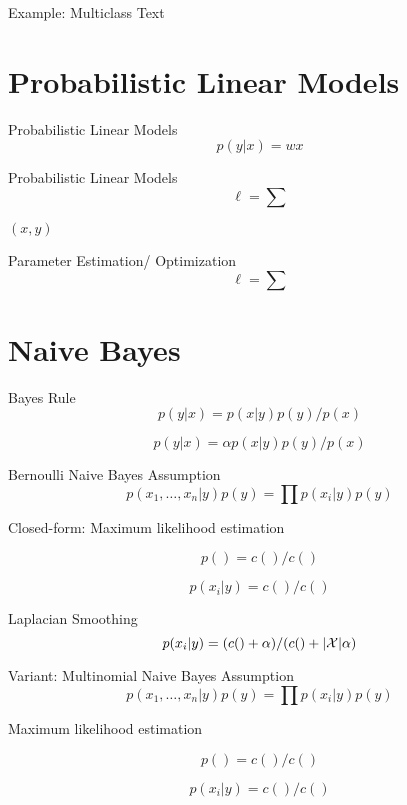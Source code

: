 \documentclass{beamer}
\begin{document}
\begin{frame}{Example: Multiclass Text}
  
\end{frame}

\section{Probabilistic Linear Models}


\begin{frame}{Probabilistic Linear Models} 
  \[ p(y | x) = w x \] 
\end{frame}


\begin{frame}{Probabilistic Linear Models} 
  \[ \ell = \sum \] 
\end{frame}

\begin{frame}
  $(x, y)$
\end{frame}

\begin{frame}{Parameter Estimation/ Optimization} 
  \[ \ell = \sum \] 

\end{frame}


\section{Naive Bayes}

\begin{frame}{Bayes Rule} 
  \[ p(y | x) = p(x | y) p(y) / p(x) \] 

  \[ p(y | x) = \alpha p(x | y) p(y) / p(x) \] 

\end{frame}


\begin{frame}{Bernoulli Naive Bayes Assumption} 
  \[ p(x_1, \ldots, x_n | y) p(y) = \prod p(x_i | y) p(y)  \] 
  
  Closed-form: Maximum likelihood estimation
  
  \[p() = c() / c() \] 

  \[p(x_i | y) = c() / c() \] 
\end{frame}

\begin{frame}{Laplacian Smoothing}
  \[p(x_i | y) = (c() + \alpha) / (c() + |\mathcal{X}| \alpha) \] 
\end{frame}

\begin{frame}{Variant: Multinomial Naive Bayes Assumption} 
  \[ p(x_1, \ldots, x_n | y) p(y) = \prod p(x_i | y) p(y)  \] 
  
  Maximum likelihood estimation
  
  \[p() = c() / c() \] 

  \[p(x_i | y) = c() / c() \] 
\end{frame}
\end{document}

